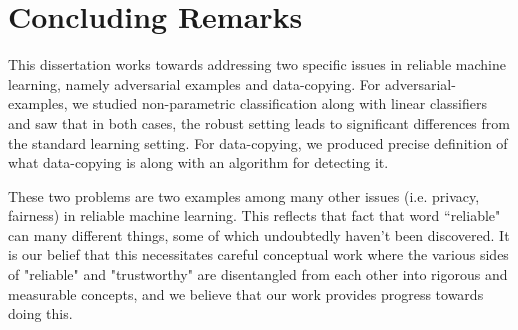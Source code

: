 \chapter*{Concluding Remarks}

This dissertation works towards addressing two specific issues in reliable machine learning, namely adversarial examples and data-copying. For adversarial-examples, we studied non-parametric classification along with linear classifiers and saw that in both cases, the robust setting leads to significant differences from the standard learning setting. For data-copying, we produced precise definition of what data-copying is along with an algorithm for detecting it. 

These two problems are two examples among many other issues (i.e. privacy, fairness) in reliable machine learning. This reflects that fact that word ``reliable" can many different things, some of which undoubtedly haven't been discovered. It is our belief that this necessitates careful conceptual work where the various sides of "reliable" and "trustworthy" are disentangled from each other into rigorous and measurable concepts, and we believe that our work provides progress towards doing this. 



